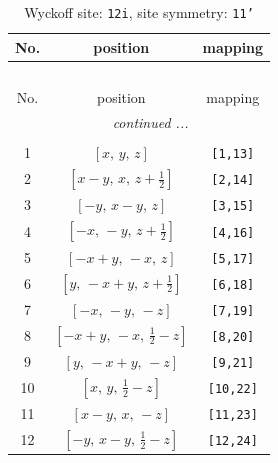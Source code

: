 \documentclass[fleqn,8pt]{jsarticle}
\begin{document}
\renewcommand{\arraystretch}{1.2}
\begin{longtable}{ccc}
\caption{Wyckoff site: {\tt 12i}, site symmetry: {\tt 11'}}
 \\
 \hline \hline
No. & position & mapping \\ \hline \endfirsthead

\multicolumn{2}{l}{\tablename\ \thetable{}} \\
 \hline \hline
No. & position & mapping \\ \hline \endhead

 \hline \hline
\multicolumn{2}{r}{\footnotesize\it continued ...} \\ \endfoot

 \hline \hline
\multicolumn{2}{r}{} \\ \endlastfoot

1 & $\left[ x,\, y,\, z \right]$ & {\tt [1,13]} \\ \hline
2 & $\left[ x - y,\, x,\, z + \frac{1}{2} \right]$ & {\tt [2,14]} \\ \hline
3 & $\left[ - y,\, x - y,\, z \right]$ & {\tt [3,15]} \\ \hline
4 & $\left[ - x,\, - y,\, z + \frac{1}{2} \right]$ & {\tt [4,16]} \\ \hline
5 & $\left[ - x + y,\, - x,\, z \right]$ & {\tt [5,17]} \\ \hline
6 & $\left[ y,\, - x + y,\, z + \frac{1}{2} \right]$ & {\tt [6,18]} \\ \hline
7 & $\left[ - x,\, - y,\, - z \right]$ & {\tt [7,19]} \\ \hline
8 & $\left[ - x + y,\, - x,\, \frac{1}{2} - z \right]$ & {\tt [8,20]} \\ \hline
9 & $\left[ y,\, - x + y,\, - z \right]$ & {\tt [9,21]} \\ \hline
10 & $\left[ x,\, y,\, \frac{1}{2} - z \right]$ & {\tt [10,22]} \\ \hline
11 & $\left[ x - y,\, x,\, - z \right]$ & {\tt [11,23]} \\ \hline
12 & $\left[ - y,\, x - y,\, \frac{1}{2} - z \right]$ & {\tt [12,24]} \\
\end{longtable}
\end{document}
